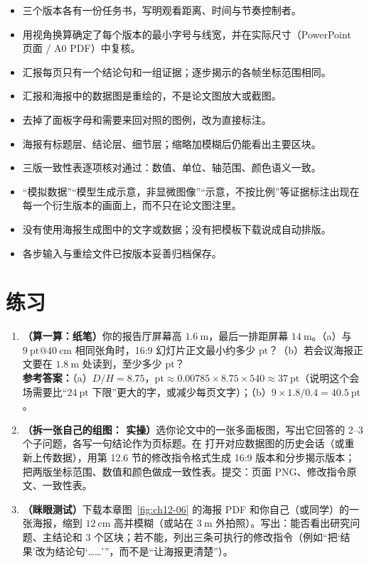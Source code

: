\begin{itemize}
\item 三个版本各有一份任务书，写明观看距离、时间与节奏控制者。
\item 用视角换算确定了每个版本的最小字号与线宽，并在实际尺寸（PowerPoint 页面 / A0 PDF）中复核。
\item 汇报每页只有一个结论句和一组证据；逐步揭示的各帧坐标范围相同。
\item 汇报和海报中的数据图是重绘的，不是论文图放大或截图。
\item 去掉了面板字母和需要来回对照的图例，改为直接标注。
\item 海报有标题层、结论层、细节层；缩略加模糊后仍能看出主要区块。
\item 三版一致性表逐项核对通过：数值、单位、轴范围、颜色语义一致。
\item “模拟数据”“模型生成示意，非显微图像”“示意，不按比例”等证据标注出现在每一个衍生版本的画面上，而不只在论文图注里。
\item 没有使用海报生成图中的文字或数据；没有把模板下载说成自动排版。
\item 各步输入与重绘文件已按版本妥善归档保存。
\end{itemize}

\section{练习}

\begin{enumerate}
\item \textbf{（算一算：纸笔）}你的报告厅屏幕高 $1.6\ \text{m}$，最后一排距屏幕 $14\ \text{m}$。（a）与 $9\ \text{pt}@40\ \text{cm}$ 相同张角时，16:9 幻灯片正文最小约多少 $\text{pt}$？（b）若会议海报正文要在 $1.8\ \text{m}$ 处读到，至少多少 $\text{pt}$？\\
{\footnotesize \textbf{参考答案：}（a）$D/H = 8.75$，$\text{pt} \approx 0.00785 \times 8.75 \times 540 \approx 37\ \text{pt}$（说明这个会场需要比“$24\ \text{pt}$ 下限”更大的字，或减少每页文字）；（b）$9 \times 1.8 / 0.4 = 40.5\ \text{pt}$。}

\item \textbf{（拆一张自己的组图：\scidraw{} 实操）}选你论文中的一张多面板图，写出它回答的 2--3 个子问题，各写一句结论作为页标题。在  打开对应数据图的历史会话（或重新上传数据），用第 12.6 节的修改指令格式生成 16:9 版本和分步揭示版本；把两版坐标范围、数值和颜色做成一致性表。提交：页面 PNG、修改指令原文、一致性表。

\item \textbf{（眯眼测试）}下载本章图~\ref{fig:ch12-06} 的海报 PDF 和你自己（或同学）的一张海报，缩到 $12\ \text{cm}$ 高并模糊（或站在 $3\ \text{m}$ 外拍照）。写出：能否看出研究问题、主结论和 3 个区块；若不能，列出三条可执行的修改指令（例如“把‘结果’改为结论句‘……’”，而不是“让海报更清楚”）。
\end{enumerate}

